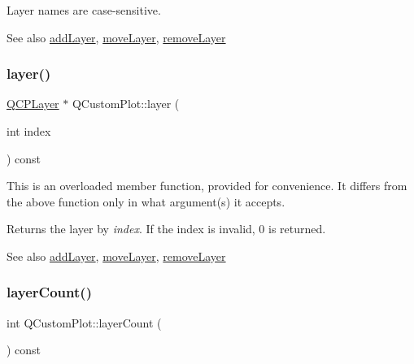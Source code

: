 Layer names are case-\/sensitive.

\begin{DoxySeeAlso}{See also}
\hyperlink{classQCustomPlot_ad5255393df078448bb6ac83fa5db5f52}{add\+Layer}, \hyperlink{classQCustomPlot_ae896140beff19424e9e9e02d6e331104}{move\+Layer}, \hyperlink{classQCustomPlot_a40f75e342c5eaab6a86066a42a0e2a94}{remove\+Layer} 
\end{DoxySeeAlso}
\mbox{\label{classQCustomPlot_acbb570f4c24306e7c2324d40bfe157c2}} 
\subsubsection{\texorpdfstring{layer()}{layer()}\hspace{0.1cm}{\footnotesize\ttfamily [2/2]}}
{\footnotesize\ttfamily \hyperlink{classQCPLayer}{Q\+C\+P\+Layer} $\ast$ Q\+Custom\+Plot\+::layer (\begin{DoxyParamCaption}\item[{int}]{index }\end{DoxyParamCaption}) const}

This is an overloaded member function, provided for convenience. It differs from the above function only in what argument(s) it accepts.

Returns the layer by {\itshape index}. If the index is invalid, 0 is returned.

\begin{DoxySeeAlso}{See also}
\hyperlink{classQCustomPlot_ad5255393df078448bb6ac83fa5db5f52}{add\+Layer}, \hyperlink{classQCustomPlot_ae896140beff19424e9e9e02d6e331104}{move\+Layer}, \hyperlink{classQCustomPlot_a40f75e342c5eaab6a86066a42a0e2a94}{remove\+Layer} 
\end{DoxySeeAlso}
\mbox{\label{classQCustomPlot_afa45d61e65292026f4c58c9c88c2cef0}} 
\subsubsection{\texorpdfstring{layer\+Count()}{layerCount()}}
{\footnotesize\ttfamily int Q\+Custom\+Plot\+::layer\+Count (\begin{DoxyParamCaption}{ }\end{DoxyParamCaption}) const}

